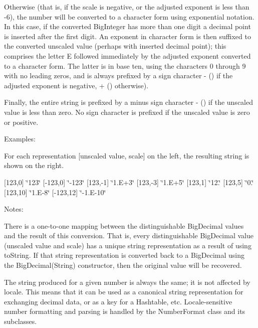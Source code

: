 Otherwise (that is, if the scale is negative, or the adjusted exponent is less than -\/6), the number will be converted to a character form using exponential notation. In this case, if the converted Big\+Integer has more than one digit a decimal point is inserted after the first digit. An exponent in character form is then suffixed to the converted unscaled value (perhaps with inserted decimal point); this comprises the letter \textquotesingle{}E\textquotesingle{} followed immediately by the adjusted exponent converted to a character form. The latter is in base ten, using the characters \textquotesingle{}0\textquotesingle{} through \textquotesingle{}9\textquotesingle{} with no leading zeros, and is always prefixed by a sign character \textquotesingle{}-\/\textquotesingle{} (\textquotesingle{}\textquotesingle{}) if the adjusted exponent is negative, \textquotesingle{}+\textquotesingle{} (\textquotesingle{}\textquotesingle{}) otherwise). 

Finally, the entire string is prefixed by a minus sign character \textquotesingle{}-\/\textquotesingle{} (\textquotesingle{}\textquotesingle{}) if the unscaled value is less than zero. No sign character is prefixed if the unscaled value is zero or positive. 

Examples\+: 

For each representation \mbox{[}unscaled value, scale\mbox{]} on the left, the resulting string is shown on the right. 

\mbox{[}123,0\mbox{]} \char`\"{}123\char`\"{} \mbox{[}-\/123,0\mbox{]} \char`\"{}-\/123\char`\"{} \mbox{[}123,-\/1\mbox{]} \char`\"{}1.\+E+3\char`\"{} \mbox{[}123,-\/3\mbox{]} \char`\"{}1.\+E+5\char`\"{} \mbox{[}123,1\mbox{]} \char`\"{}12.\char`\"{} \mbox{[}123,5\mbox{]} \char`\"{}0.\char`\"{} \mbox{[}123,10\mbox{]} \char`\"{}1.\+E-\/8\char`\"{} \mbox{[}-\/123,12\mbox{]} \char`\"{}-\/1.\+E-\/10\char`\"{} 

Notes\+: 

There is a one-\/to-\/one mapping between the distinguishable Big\+Decimal values and the result of this conversion. That is, every distinguishable Big\+Decimal value (unscaled value and scale) has a unique string representation as a result of using to\+String. If that string representation is converted back to a Big\+Decimal using the Big\+Decimal(\+String) constructor, then the original value will be recovered. 

The string produced for a given number is always the same; it is not affected by locale. This means that it can be used as a canonical string representation for exchanging decimal data, or as a key for a Hashtable, etc. Locale-\/sensitive number formatting and parsing is handled by the Number\+Format class and its subclasses. 

